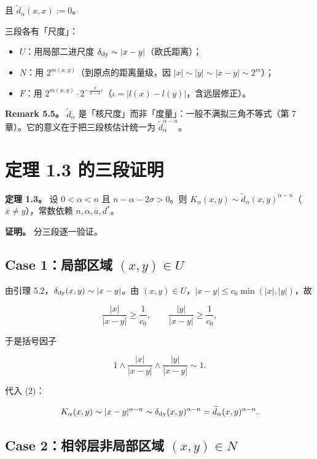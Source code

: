 \documentclass[a4paper,11pt,openany]{ctexbook}
\numberwithin{equation}{chapter}
\numberwithin{figure}{chapter}
\numberwithin{table}{chapter}
\begin{document}
且 $\widetilde d_\alpha(x,x):=0$。

\begin{intuitionbox}
三段各有「尺度」：
\end{intuitionbox}

\begin{itemize}
\item $U$：用局部二进尺度 $\delta_{\rm dy}\sim|x-y|$（欧氏距离）；
\item $N$：用 $2^{m(x,y)}$（到原点的距离量级，因 $|x|\sim|y|\sim|x-y|\sim2^{m}$）；
\item $F$：用 $2^{m(x,y)}\cdot2^{-\frac{\sigma}{n-\alpha}\iota}$（$\iota=|l(x)-l(y)|$，含远层修正）。
\end{itemize}

\textbf{Remark 5.5。} $\widetilde d_\alpha$ 是「核尺度」而非「度量」：一般不满拟三角不等式（第 7 章）。它的意义在于把三段核估计统一为 $\widetilde d_\alpha^{\alpha-n}$。

\section{定理 1.3 的三段证明}

\textbf{定理 1.3。} 设 $0<\alpha<n$ 且 $n-\alpha-2\sigma>0$。则 $K_\alpha(x,y)\sim\widetilde d_\alpha(x,y)^{\alpha-n}$（$x\neq y$），常数依赖 $n,\alpha,a,d^*$。

\textbf{证明。} 分三段逐一验证。

\subsection{Case 1：局部区域 $(x,y)\in U$}

由引理 5.2，$\delta_{\rm dy}(x,y)\sim|x-y|$。由 $(x,y)\in U$，$|x-y|\le c_0\min(|x|,|y|)$，故

$$\frac{|x|}{|x-y|}\ge\frac1{c_0},\qquad\frac{|y|}{|x-y|}\ge\frac1{c_0},$$

于是括号因子

$$1\wedge\frac{|x|}{|x-y|}\wedge\frac{|y|}{|x-y|}\sim1.$$

代入 (2)：

$$K_\alpha(x,y)\sim|x-y|^{\alpha-n}\sim\delta_{\rm dy}(x,y)^{\alpha-n}=\widetilde d_\alpha(x,y)^{\alpha-n}.$$

\subsection{Case 2：相邻层非局部区域 $(x,y)\in N$}
\end{document}
